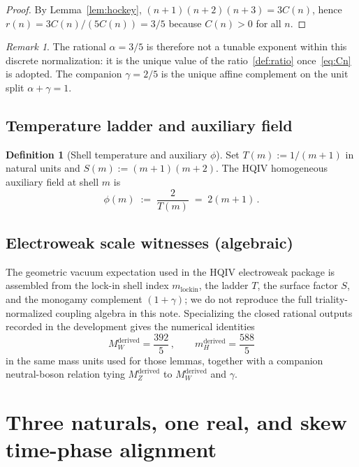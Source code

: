 \documentclass[11pt,a4paper]{article}
\theoremstyle{plain}
\theoremstyle{definition}
\newtheorem{definition}[theorem]{Definition}
\theoremstyle{remark}
\newtheorem{remark}[theorem]{Remark}
\theoremstyle{plain}
\theoremstyle{definition}
\begin{document}
\begin{proof}
By Lemma~\ref{lem:hockey}, $(n+1)(n+2)(n+3)=3C(n)$, hence $r(n)=3C(n)/(5C(n))=3/5$ because $C(n)>0$ for all $n$.
\end{proof}

\begin{remark}
The rational $\alpha=3/5$ is therefore not a tunable exponent within this discrete normalization: it is the unique value of the ratio~\eqref{def:ratio} once~\eqref{eq:Cn} is adopted.
The companion $\gamma=2/5$ is the unique affine complement on the unit split $\alpha+\gamma=1$.
\end{remark}

\subsection{Temperature ladder and auxiliary field}

\begin{definition}[Shell temperature and auxiliary $\phi$]\label{def:phi}
Set $T(m):=1/(m+1)$ in natural units and $S(m):=(m+1)(m+2)$.
The HQIV homogeneous auxiliary field at shell $m$ is
\[
  \phi(m) \;:=\; \frac{2}{T(m)} \;=\; 2(m+1)\,.
\]
\end{definition}

\subsection{Electroweak scale witnesses (algebraic)}

The geometric vacuum expectation used in the HQIV electroweak package is assembled from the lock-in shell index $m_{\mathrm{lockin}}$, the ladder $T$, the surface factor $S$, and the monogamy complement $(1+\gamma)$; we do not reproduce the full triality-normalized coupling algebra in this note.
Specializing the closed rational outputs recorded in the development gives the numerical identities
\begin{equation}\label{eq:MW}
  M_W^{\mathrm{derived}}=\frac{392}{5}\,,\qquad
  m_H^{\mathrm{derived}}=\frac{588}{5}
\end{equation}
in the same mass units used for those lemmas, together with a companion neutral-boson relation tying $M_Z^{\mathrm{derived}}$ to $M_W^{\mathrm{derived}}$ and $\gamma$.

\section{Three naturals, one real, and skew time-phase alignment}
\end{document}
